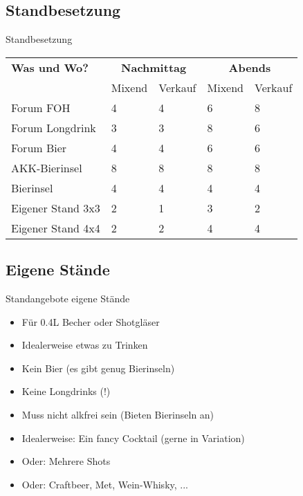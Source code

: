\subsection{Standbesetzung}

{
    
}

\begin{frame}[c]{Standbesetzung}
    \small
    \begin{tabular}{l|ll|ll}
        \textbf{Was und Wo?}& \multicolumn{2}{c}{\textbf{Nachmittag}} & \multicolumn{2}{c}{\textbf{Abends}} \\
        & Mixend    & Verkauf & Mixend    & Verkauf \\
        \hline
        Forum FOH         & 4 & 4 & 6 & 8 \\
        Forum Longdrink   & 3 & 3 & 8 & 6 \\
        Forum Bier        & 4 & 4 & 6 & 6 \pause \\
        \hline
        AKK-Bierinsel       & 8 & 8 & 8 & 8 \\
        Bierinsel           & 4 & 4 & 4 & 4 \\
        Eigener Stand 3x3   & 2 & 1 & 3 & 2 \\
        Eigener Stand 4x4   & 2 & 2 & 4 & 4 \\

    \end{tabular}
\end{frame}



\subsection{Eigene Stände}


\begin{frame}[c]{Standangebote eigene Stände}
    \begin{itemize}[<+(1)->]
        \item Für 0.4L Becher oder Shotgläser
        \item Idealerweise etwas zu Trinken
        \item Kein Bier (es gibt genug Bierinseln)
        \item Keine Longdrinks (!)
        \item Muss nicht alkfrei sein (Bieten Bierinseln an)
        \item Idealerweise: Ein fancy Cocktail (gerne in Variation)
        \item Oder: Mehrere Shots
        \item Oder: Craftbeer, Met, Wein-Whisky, ...
    \end{itemize}
\end{frame}



